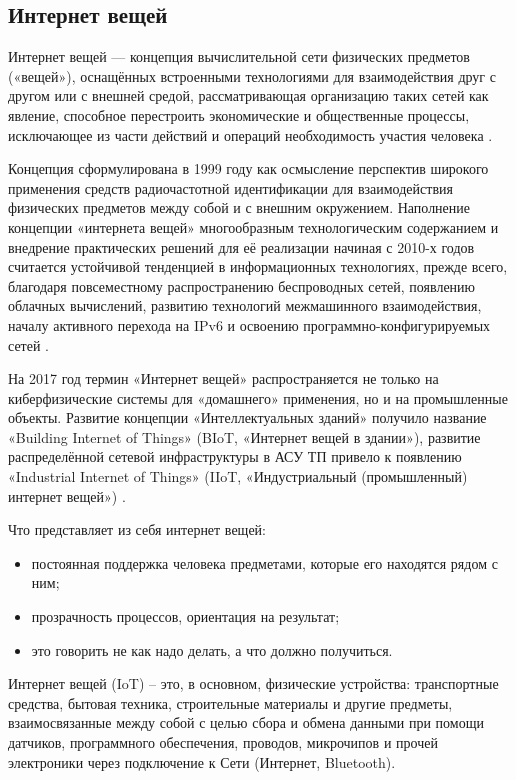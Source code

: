 \subsection{Интернет вещей}
\label{sec:subject:iot}

Интернет вещей — концепция вычислительной сети физических предметов («вещей»), оснащённых встроенными технологиями для взаимодействия друг с другом или с внешней средой, рассматривающая организацию таких сетей как явление, способное перестроить экономические и общественные процессы, исключающее из части действий и операций необходимость участия человека \cite{wiki_iot}.

Концепция сформулирована в 1999 году как осмысление перспектив широкого применения средств радиочастотной идентификации для взаимодействия физических предметов между собой и с внешним окружением. Наполнение концепции «интернета вещей» многообразным технологическим содержанием и внедрение практических решений для её реализации начиная с 2010-х годов считается устойчивой тенденцией в информационных технологиях, прежде всего, благодаря повсеместному распространению беспроводных сетей, появлению облачных вычислений, развитию технологий межмашинного взаимодействия, началу активного перехода на IPv6 и освоению программно-конфигурируемых сетей \cite{wiki_iot}.

На 2017 год термин «Интернет вещей» распространяется не только на киберфизические системы для «домашнего» применения, но и на промышленные объекты. Развитие концепции «Интеллектуальных зданий» получило название «Building Internet of Things» (BIoT, «Интернет вещей в здании»), развитие распределённой сетевой инфраструктуры в АСУ ТП привело к появлению «Industrial Internet of Things» (IIoT, «Индустриальный (промышленный) интернет вещей») \cite{wiki_iot}.

Что представляет из себя интернет вещей:
\begin{itemize}
	\item постоянная поддержка человека предметами, которые его находятся рядом с ним;
	\item прозрачность процессов, ориентация на результат;
	\item это говорить не как надо делать, а что должно получиться.
\end{itemize}

Интернет вещей (IoT) – это, в основном, физические устройства: транспортные средства, бытовая техника, строительные материалы и другие предметы, взаимосвязанные между собой с целью сбора и обмена данными при помощи датчиков, программного обеспечения, проводов, микрочипов и прочей электроники через подключение к Сети (Интернет, Bluetooth).

